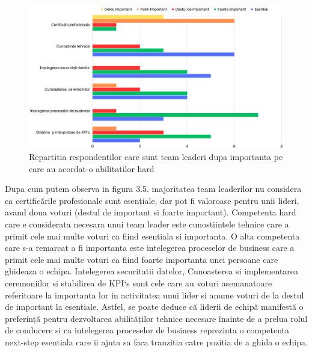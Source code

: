 \documentclass[a4paper, 12pt]{article}
\begin{document}
	\quad 



		\begin{figure}[!htb]
			\centering
			\includegraphics[width=17cm, height=12 cm]{"figures/team leaders (1).png"}
			\caption {Repartitia respondentilor care sunt team leaderi dupa importanta pe care au acordat-o abilitatilor hard}\label{fig:four}
			
		\end{figure}

	\quad Dupa cum putem observa in figura 3.5. majoritatea team leaderilor nu considera ca certificările profesionale sunt esențiale, dar pot fi valoroase pentru unii lideri, avand doua voturi (destul de important si foarte important). Competenta hard care e considerata necesara unui team leader este cunostiintele tehnice care a primit cele mai multe voturi ca fiind esentiala si importanta. O alta competenta  care s-a remarcat a fi importanta este intelegerea proceselor de business care a primit cele mai multe voturi ca fiind foarte importanta unei persoane care ghideaza o echipa. Intelegerea securitatii datelor, Cunoasterea si implementarea ceremoniilor si stabilirea de KPI`s sunt cele care au voturi asemanatoare referitoare la importanta lor in activitatea unui lider si anume voturi de la destul de important la esentiale. Astfel, se poate deduce că liderii de echipă manifestă o preferință pentru dezvoltarea abilităților tehnice necesare înainte de a prelua rolul de conducere si ca intelegerea proceselor de business reprezinta o competenta next-step esentiala  care ii ajuta sa faca tranzitia catre pozitia de a ghida o echipa. 
\end{document}

